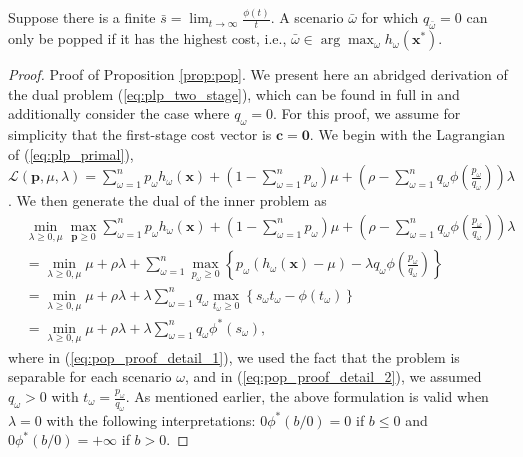 \documentclass[opre,nonblindrev]{informs3} %
\newcommand{\x}{\mathbf{x}}
\renewcommand{\c}{\mathbf{c}}
\newcommand{\p}{\mathbf{p}}
\begin{document}
\begin{proposition} \label{prop:pop}
	Suppose there is a finite $\bar{s} = \lim_{t \rightarrow \infty} \frac{\phi(t)}{t}$.
	A scenario $\bar{\omega}$ for which $q_{\bar{\omega}} = 0$ can only be popped if 
it has the highest cost, i.e.,  $\bar{\omega} \in \arg\max_{\omega} h_\omega(\x^*)$. 
\end{proposition}

\begin{proof}{\sc Proof of Proposition \ref{prop:pop}.}
	We present here an abridged derivation of the dual problem (\ref{eq:plp_two_stage}), which can be found in full in \cite{bental2013robust} and additionally consider the case where $q_\omega = 0$.
	For this proof, we assume for simplicity that the first-stage cost vector is $\c = \mathbf{0}$.	
	We begin with the Lagrangian of (\ref{eq:plp_primal}), $\mathcal{L}(\p,\mu,\lambda) = \sum_{\omega=1}^n p_\omega h_\omega(\x) + \left( 1-\sum_{\omega=1}^n p_\omega \right)\mu + \left( \rho - \sum_{\omega=1}^n q_\omega \phi\left(\frac{p_\omega}{q_\omega}\right) \right)\lambda$. 
We then generate the dual of the inner problem as
	\begin{align}
		 & \min_{\lambda \geq 0, \mu} \max_{\p \geq 0} \sum_{\omega=1}^n p_\omega h_\omega(\x) + \left( 1-\sum_{\omega=1}^n p_\omega \right)\mu + \left( \rho - \sum_{\omega=1}^n q_\omega \phi\left(\frac{p_\omega}{q_\omega}\right) \right)\lambda \nonumber \\
		& = \min_{\lambda \geq 0, \mu} \mu + \rho\lambda + \sum_{\omega=1}^n \max_{p_\omega \geq 0} \left\{ p_\omega (h_\omega(\x) - \mu) - \lambda q_\omega \phi\left(\frac{p_\omega}{q_\omega}\right) \right\} \label{eq:pop_proof_detail_1} \\
		& =  \min_{\lambda \geq 0, \mu} \mu + \rho\lambda + \lambda \sum_{\omega=1}^n q_\omega \max_{t_\omega \geq 0} \left\{ s_\omega t_\omega - \phi(t_\omega) \right\} \label{eq:pop_proof_detail_2} \\
		& = \min_{\lambda \geq 0, \mu} \mu + \rho\lambda + \lambda \sum_{\omega=1}^n q_\omega \phi^*\left(s_\omega\right), \nonumber
	\end{align}
	where in (\ref{eq:pop_proof_detail_1}), we used the fact that the problem is separable for each scenario $\omega$, and in (\ref{eq:pop_proof_detail_2}), we assumed $q_\omega > 0$ with $t_\omega = \frac{p_\omega}{q_\omega}$.
	As mentioned earlier, the above formulation is valid when $\lambda =0$ with the following interpretations: $0\phi^*(b/0)=0$ if $b\leq 0$ and  $0\phi^*(b/0)=+\infty$ if $b > 0$.
	

\end{proof}
\end{document}

